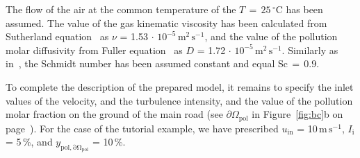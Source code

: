 The flow of the air at the common temperature of the $T\,=\,25\,^\circ$C has been assumed. The value of the gas kinematic viscosity has been calculated from Sutherland equation~\cite{sutherland1893} as $\nu$ = 1.53$\,\cdot\, 10^{-5}\,\mathrm{m^2\,s^{-1}}$, and the value of the pollution molar diffusivity from Fuller equation~\cite{fuller66} as $D$ = 1.72$\,\cdot\, 10^{-5}\,\mathrm{m^2\,s^{-1}}$.  Similarly as in~\cite{baik03}, the Schmidt number has been assumed constant and equal Sc$\,=\,0.9$.

To complete the description of the prepared model, it remains to specify the inlet values of the velocity, and the turbulence intensity, and the value of the pollution molar fraction on the ground of the main road (see $\partial\Omega_{\mathrm{pol}}$ in Figure~\ref{fig:bc}b on page~\pageref{fig:bc}). For the case of the tutorial example, we have prescribed $u_{\mathrm{in}}$ = 10\,$\mathrm{m\,s^{-1}}$, $I_\mathrm{i}$ = 5\,\%, and $y_{\mathrm{pol,\partial\Omega_{\mathrm{pol}}}}$ = 10\,\%.